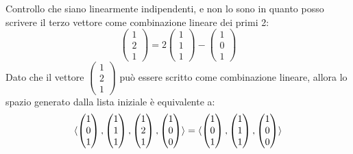 \documentclass[a4paper,12pt]{article}
\begin{document}
\begin{itemize}
		Controllo che siano linearmente indipendenti, e non lo sono in quanto posso scrivere il terzo vettore come combinazione lineare dei primi 2:
		\[\begin{pmatrix} 1 \\ 2 \\ 1\end{pmatrix} = 2\begin{pmatrix} 1 \\ 1 \\ 1 \end{pmatrix} - \begin{pmatrix} 1 \\ 0 \\ 1 \end{pmatrix}\]
		Dato che il vettore $\begin{pmatrix} 1 \\ 2 \\ 1 \end{pmatrix}$ può essere scritto come combinazione lineare, allora lo spazio generato dalla lista iniziale è equivalente a:
		\[\langle \begin{pmatrix} 1 \\ 0 \\ 1 \end{pmatrix}, \begin{pmatrix} 1 \\ 1 \\ 1 \end{pmatrix}, \begin{pmatrix} 1 \\ 2 \\ 1 \end{pmatrix}, \begin{pmatrix} 1 \\ 0 \\ 0 \end{pmatrix} \rangle = \langle \begin{pmatrix} 1 \\ 0 \\ 1 \end{pmatrix}, \begin{pmatrix} 1 \\ 1 \\ 1 \end{pmatrix}, \begin{pmatrix} 1 \\ 0 \\ 0 \end{pmatrix} \rangle\]
		

\end{itemize}
\end{document}
